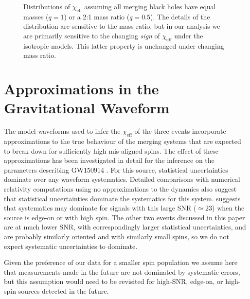 \documentclass[modern,linenumbers]{aastex61}
\newcommand{\chieff}{\chi_\mathrm{eff}}
\begin{document}
\begin{figure}
  \caption{Distributions of $\chieff$ assuming all merging black holes
    have equal masses ($q=1$) or a 2:1 mass ratio ($q = 0.5$).  The
    details of the distribution are sensitive to the mass ratio, but
    in our analysis we are primarily sensitive to the changing
    \emph{sign} of $\chieff$ under the isotropic models.  This latter
    property is unchanged under changing mass ratio.}
  \label{fig:mass-ratio-sensitivity}
\end{figure}

\section{Approximations in the Gravitational Waveform}
The model waveforms used to infer the $\chieff$ of the three events
incorporate approximations to the true behaviour of the merging
systems that are expected to break down for sufficiently high
mis-aligned spins.  The effect of these approximations has been
investigated in detail for the inference on the parameters describing
GW150914 \citep{2016arXiv161107531T}.  For this source, statistical
uncertainties dominate over any waveform systematics.  Detailed
comparisons with numerical relativity computations using no
approximations to the dynamics \citep{2016PhRvD..94f4035A} also
suggest that statistical uncertainties dominate the systematics for
this system.  \citet{2016arXiv161107531T} suggests that systematics
may dominate for signals with this large SNR ($\simeq 23$) when the
source is edge-on or with high spin.  The other two events discussed
in this paper are at much lower SNR, with correspondingly larger
statistical uncertainties, and are probably similarly oriented and
with similarly small spins, so we do not expect systematic
uncertainties to dominate.  

Given the preference of our data for a smaller spin population we
assume here that measurements made in the future are not dominated by
systematic errors, but this assumption would need to be revisited for
high-SNR, edge-on, or high-spin sources detected in the future.


\end{document}
